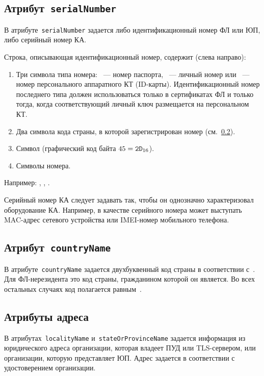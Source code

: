 \subsection{Атрибут~\texttt{serialNumber}}\label{ENTITIES.Id.SN}

В атрибуте~\texttt{serialNumber} задается либо идентификационный номер ФЛ 
или ЮП, либо серийный номер КА. 

Строка, описывающая идентификационный номер, содержит (слева направо):
\begin{enumerate}
\item
Три символа типа номера:
~--- номер паспорта, 
~--- личный номер или
~--- номер персонального аппаратного КТ (ID-карты).
%
Идентификационный номер последнего типа должен использоваться 
только в сертификатах ФЛ и только тогда, когда соответствующий личный 
ключ размещается на персональном КТ.

\item
Два символа кода страны, в которой зарегистрирован номер 
(см.~\ref{ENTITIES.Id.C}).
\item
Символ \str{-} (графический код байта $45=\texttt{2D}_{16}$).
\item
Символы номера.
\end{enumerate}

Например: , 
, 
.

Серийный номер КА следует задавать так, чтобы он однозначно 
характеризовал оборудование КА. Например, в качестве серийного номера 
может выступать MAC-адрес сетевого устройства или IMEI-номер мобильного 
телефона. 

\subsection{Атрибут~\texttt{countryName}}\label{ENTITIES.Id.C}

В атрибуте~\texttt{countryName} задается двухбуквенный код страны
в соответствии с~\cite{CountryCodes}. 
%
Для ФЛ-нерезидента это код страны, гражданином которой он является.
Во всех остальных случаях код полагается равным~.

\subsection{Атрибуты адреса}\label{ENTITIES.Id.L}

В атрибутах~\texttt{localityName} и~\texttt{stateOrProvinceName} 
задается информация из юридического адреса организации,
которая владеет ПУД или TLS-сервером, или организации, 
которую представляет ЮП.
%
Адрес задается в соответствии с удостоверением организации. 

